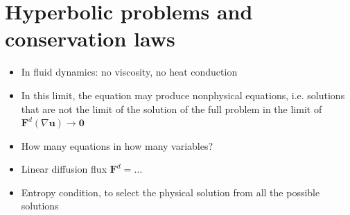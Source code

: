 \documentclass[letterpaper,10pt,english]{jupyterBook}
\begin{document}
\sphinxstepscope


\section{Hyperbolic problems and conservation laws}
\label{\detokenize{ch/pde/hyperbolic-intro:hyperbolic-problems-and-conservation-laws}}\label{\detokenize{ch/pde/hyperbolic-intro:pde-hyperbolic-intro}}\label{\detokenize{ch/pde/hyperbolic-intro::doc}}
\sphinxAtStartPar
{}
\begin{itemize}
\item {} 
\sphinxAtStartPar
In fluid dynamics: no viscosity, no heat conduction

\item {} 
\sphinxAtStartPar
In this limit, the equation may produce non\sphinxhyphen{}physical equations, i.e. solutions that are not the limit of the solution of the full problem in the limit of \(\mathbf{F}^d(\nabla \mathbf{u}) \rightarrow \mathbf{0}\)

\item {} 
\sphinxAtStartPar
How many equations in how many variables?

\item {} 
\sphinxAtStartPar
Linear diffusion flux \(\mathbf{F}^d = \dots\)

\item {} 
\sphinxAtStartPar
Entropy condition, to select the physical solution from all the possible solutions

\end{itemize}
\end{document}
